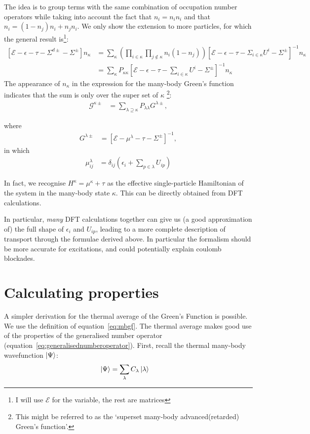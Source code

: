 The idea is to group terms with the same combination of occupation number operators while taking into account the fact that $n_i = n_i n_i$ and that $n_i = (1-n_j)n_i + n_j n_i$. We only show the extension to more particles, for which the general result is\footnote{I will use $\mathscr{E}$ for the variable, the rest are matrices}:
\begin{align*}
\left[ \mathscr{E} - \epsilon - \tau -\Sigma^{d\pm} - \Sigma^\pm \right] n_\kappa &= \sum_\kappa \left( \prod_{i\in\kappa} \prod_{j\notin\kappa} n_i (1-n_j) \right) \left[ \mathscr{E} - \epsilon -\tau - \Sigma_{i \in \kappa}U^i - \Sigma^\pm \right]^{-1} n_\kappa\\
&= \sum_\kappa P_{\kappa\kappa} \left[ \mathscr{E} - \epsilon - \tau - \sum_{i\in\kappa} U^i - \Sigma^\pm \right]^{-1}n_\kappa
\end{align*}
The appearance of $n_\kappa$ in the expression for the many-body Green's function indicates that the sum is only over the super set of $\kappa$ \footnote{This might be referred to as the `superset many-body advanced(retarded) Green's function'.}:
\begin{align}
\mathscr{G}^{\kappa\pm} &= \sum_{\lambda\supseteq\kappa} P_{\lambda\lambda} G^{\lambda\pm},\label{eq:mbgfresult}
\end{align}

where 
\begin{align*}
G^{\lambda\pm} &= \left[\mathscr{E} - \mu^\lambda - \tau - \Sigma^\pm \right]^{-1},
\end{align*} in which
\begin{align}
\mu^\lambda_{ij} &= \delta_{ij} \left( \epsilon_i + \sum_{p\in\lambda} U_{ip} \right) \label{eq:result}
\end{align}

In fact, we recognise $H^\kappa = \mu^\kappa + \tau$ as the effective single-particle Hamiltonian of the system in the many-body state $\kappa$. This can be directly obtained from DFT calculations.   

In particular, \emph{many} DFT calculations together can give us (a good approximation of) the full shape of $\epsilon_i$ and $U_{ip}$, leading to a more complete description of transport through the formulae derived above. In particular the formalism should be more accurate for excitations, and could potentially explain coulomb blockades.

\section{Calculating properties}
\label{sec:calcprop}
A simpler derivation for the thermal average of the Green's Function is possible. We use the definition of equation~\ref{eq:mbgf}. The thermal average makes good use of the properties of the generalised number operator (equation~\ref{eq:generalisednumberoperator}). First, recall the thermal many-body wavefunction $\ket{\Psi}$:
\begin{align*}
\ket{\Psi} &= \sum_\lambda C_\lambda \ket{\lambda}
\end{align*}

